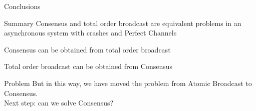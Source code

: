\begin{frame}{Conclusions}

\begin{block}{Summary}
Consensus and total order broadcast are equivalent problems in an asynchronous system with crashes and Perfect Channels

\BIL
\item Consensus can be obtained from total order broadcast
\item Total order broadcast can be obtained from Consensus
\EIL
\end{block}

\begin{block}{Problem}
But in this way, we have moved the problem from Atomic Broadcast to Consensus.\\
Next step: can we solve Consensus?
\end{block}
 
\end{frame}



\nocite{hadzilacos94modular}
\ReadingMaterial


